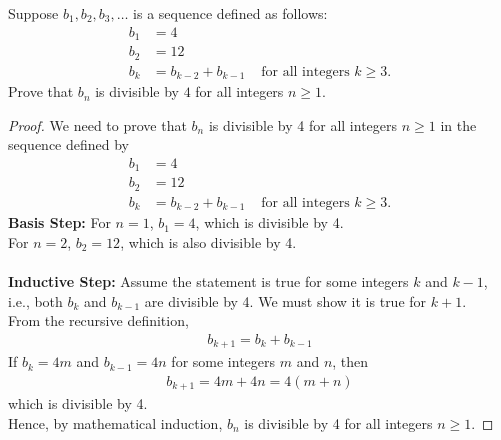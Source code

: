 \documentclass[name=Ojas\ Chaturvedi, emailid=oj.chaturvedi.2024, course=Capstone:\ Discrete\ Math, num=9, deadline={November\ 17,\ 2023}]{homework}
\begin{document}
    Suppose $b_1, b_2, b_3, \ldots$ is a sequence defined as follows:
    \begin{align*}
        b_1 &= 4 \\
        b_2 &= 12 \\
        b_k &= b_{k-2} + b_{k-1} & \text{ for all integers } k \geq 3.
    \end{align*}
    Prove that $b_n$ is divisible by $4$ for all integers $n \geq 1$.
\begin{proof}
    We need to prove that $b_n$ is divisible by 4 for all integers $n \geq 1$ in the sequence defined by
    \begin{align*}
        b_1 &= 4 \\
        b_2 &= 12 \\
        b_k &= b_{k-2} + b_{k-1} & \text{ for all integers } k \geq 3.
    \end{align*}
    \textbf{Basis Step:}
    For $n = 1$, $b_1 = 4$, which is divisible by 4. \\
    For $n = 2$, $b_2 = 12$, which is also divisible by 4. \\ \\
    \textbf{Inductive Step:}
    Assume the statement is true for some integers $k$ and $k-1$, i.e., both $b_k$ and $b_{k-1}$ are divisible by 4. We must show it is true for $k+1$. \\
    From the recursive definition,
    \begin{align*}
        b_{k+1} = b_k + b_{k-1}
    \end{align*}
    If $b_k = 4m$ and $b_{k-1} = 4n$ for some integers $m$ and $n$, then
    \begin{align*}
        b_{k+1} = 4m + 4n = 4(m + n)
    \end{align*}
    which is divisible by 4. \\
    Hence, by mathematical induction, $b_n$ is divisible by 4 for all integers $n \geq 1$.
\end{proof}
\end{document}
